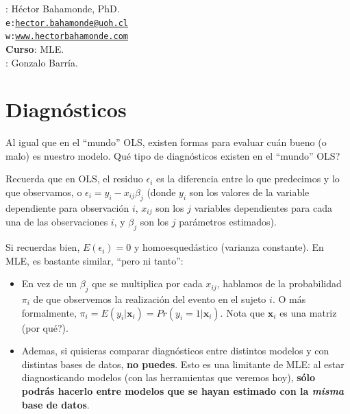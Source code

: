 \documentclass[onesided]{article}\usepackage[]{graphicx}\usepackage[]{color}
\begin{document}











\hspace{-5mm}{\bf Profesor}: H\'ector Bahamonde, PhD.\\
\texttt{e:}\href{mailto:hector.bahamonde@uoh.cl}{\texttt{hector.bahamonde@uoh.cl}}\\
\texttt{w:}\href{http://www.hectorbahamonde.com}{\texttt{www.hectorbahamonde.com}}\\
{\bf Curso}: MLE.\\
\hspace{-5mm}{\bf TA}: Gonzalo Barr\'ia.

\section{Diagn\'osticos}

Al igual que en el ``mundo'' OLS, existen formas para evaluar cu\'an bueno (o malo) es nuestro modelo. {\color{red}Qu\'e tipo de diagn\'osticos existen en el ``mundo'' OLS?}

Recuerda que en OLS, el residuo $\epsilon_{i}$ es la diferencia entre lo que predecimos y lo que observamos, o $\epsilon_{i}=y_{i}-x_{ij}\beta_{j}$ (donde $y_{i}$ son los valores de la variable dependiente para observaci\'on $i$, $x_{ij}$ son los $j$ variables dependientes para cada una de las observaciones $i$, y $\beta_{j}$ son los $j$ par\'ametros estimados). 

Si recuerdas bien, $E(\epsilon_{i})=0$ y homoesqued\'astico (varianza constante). En MLE, es bastante similar, ``pero ni tanto'':

\begin{itemize}
\item En vez de un $\beta_{j}$ que se multiplica por cada $x_{ij}$, hablamos de la probabilidad $\pi_{i}$ de que observemos la realizaci\'on del evento en el sujeto $i$. O m\'as formalmente, $\pi_{i}=E(y_{i}|{\mathbf x}_{i}) = Pr(y_{i}=1|{\mathbf x}_{i})$. Nota que ${\mathbf x}_{i}$ es una matriz ({\color{red}por qu\'e?}). 
\item Ademas, si quisieras comparar diagn\'osticos entre distintos modelos y con distintas bases de datos, {\bf no puedes}. Esto es una limitante de MLE: al estar diagnosticando modelos (con las herramientas que veremos hoy), {\bf s\'olo podr\'as hacerlo entre modelos que se hayan estimado con la \emph{misma} base de datos}.
\end{itemize}
\end{document}
